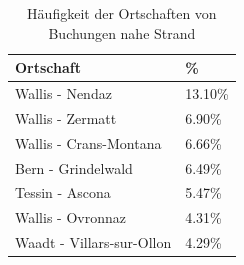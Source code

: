 \begin{table}[H] 
	\caption{Häufigkeit der Ortschaften von Buchungen nahe Strand}
	\centering
	\label{sec:testingfazit:testing:hypothesen:4}
	\begin{tabular}{ | l | l | } 
		\hline 
		\rowcolor{tableheadcolor}
		\bfseries Ortschaft & \bfseries \% \\ \hline 
		\cellcolor{green!25}Wallis - Nendaz & \cellcolor{green!25}13.10\% \\ \hline 
		\cellcolor{green!25}Wallis - Zermatt & \cellcolor{green!25}6.90\% \\ \hline 
		\cellcolor{green!25}Wallis - Crans-Montana & \cellcolor{green!25}6.66\% \\ \hline 
		\cellcolor{green!25}Bern - Grindelwald & \cellcolor{green!25}6.49\% \\ \hline 
		Tessin - Ascona & 5.47\% \\ \hline 
		Wallis - Ovronnaz & 4.31\% \\ \hline 
		\cellcolor{green!25}Waadt - Villars-sur-Ollon & \cellcolor{green!25}4.29\% \\ \hline
	\end{tabular}
\end{table}

